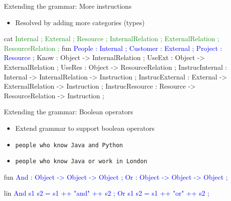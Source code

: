 \begin{frame}[fragile]{Extending the grammar: More instructions}
\begin{itemize}
\item Resolved by adding more categories (types)
\end{itemize}

\vspace{-4mm}\begin{semiverbatim}\small
cat \textcolor{ForestGreen}{
  Internal ; External ; Resource ;
  InternalRelation ; ExternalRelation ; ResourceRelation ; }\pause
fun \textcolor{Blue}{
  People   : Internal ;
  Customer : External ;
  Project  : Resource ; }\pause
  \textcolor{Type}{
  Know     : Object -> InternalRelation ;
  UseExt   : Object -> ExternalRelation ;
  UseRes   : Object -> ResourceRelation ;}\pause
  \textcolor{String}{
  InstrucInternal : Internal -> InternalRelation -> Instruction ;
  InstrucExternal : External -> ExternalRelation -> Instruction ;
  InstrucResource : Resource -> ResourceRelation -> Instruction ; }
\end{semiverbatim}
\end{frame}
\begin{frame}[fragile]{Extending the grammar: Boolean operators}
\begin{itemize}
  \item Extend grammar to support boolean operators
  \item \texttt{people who know Java and Python}
  \item \texttt{people who know Java or work in London}  
\end{itemize}
\begin{semiverbatim}
fun \textcolor{Blue}{
  And : Object -> Object -> Object ;
  Or : Object -> Object -> Object ;}
\end{semiverbatim}

\begin{semiverbatim}
lin\textcolor{Blue}{
  And s1 s2 = s1 ++ \textcolor{String}{"and"} ++ s2 ;
  Or s1 s2 = s1 ++ \textcolor{String}{"or"} ++ s2 ;}
\end{semiverbatim}
\end{frame}
%                  
